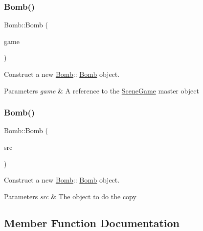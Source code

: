 \subsubsection{\texorpdfstring{Bomb()}{Bomb()}\hspace{0.1cm}{\footnotesize\ttfamily [1/2]}}
{\footnotesize\ttfamily Bomb\+::\+Bomb (\begin{DoxyParamCaption}\item[{\hyperlink{class_scene_game}{Scene\+Game} \&}]{game }\end{DoxyParamCaption})\hspace{0.3cm}{\ttfamily [explicit]}}



Construct a new \hyperlink{class_bomb}{Bomb}\+:\+: \hyperlink{class_bomb}{Bomb} object. 


\begin{DoxyParams}{Parameters}
{\em game} & A reference to the \hyperlink{class_scene_game}{Scene\+Game} master object \\
\hline
\end{DoxyParams}
\mbox{\label{class_bomb_ad02ddab443979d610ea5ad04343bd7fa}} 
\subsubsection{\texorpdfstring{Bomb()}{Bomb()}\hspace{0.1cm}{\footnotesize\ttfamily [2/2]}}
{\footnotesize\ttfamily Bomb\+::\+Bomb (\begin{DoxyParamCaption}\item[{\hyperlink{class_bomb}{Bomb} const \&}]{src }\end{DoxyParamCaption})}



Construct a new \hyperlink{class_bomb}{Bomb}\+:\+: \hyperlink{class_bomb}{Bomb} object. 


\begin{DoxyParams}{Parameters}
{\em src} & The object to do the copy \\
\hline
\end{DoxyParams}


\subsection{Member Function Documentation}
\mbox{\label{class_bomb_ae0ea4aa0ce14d353ad63c31cccc2a69d}} 
